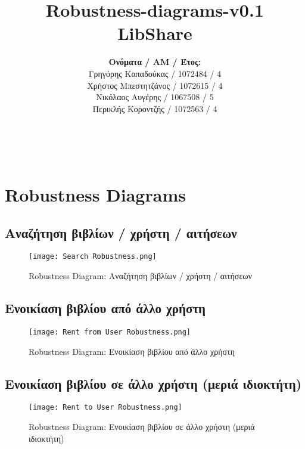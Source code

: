 \documentclass[12pt,a4paper]{article}
\title{Robustness-diagrams-v0.1 \\ LibShare}
\author{\textbf{Ονόματα / ΑΜ / Έτος:} \\ Γρηγόρης Καπαδούκας / 1072484 / 4\textdegree \\ Χρήστος Μπεστητζάνος / 1072615 / 4\textdegree \\ Νικόλαος Αυγέρης / 1067508 / 5\textdegree \\ Περικλής Κοροντζής / 1072563 / 4\textdegree}
\begin{document}
\makeatletter
\begin{center}
	\LARGE{\@title} \\
	\pagebreak
    \begin{LARGE}\@author\end{LARGE}
    \pagebreak
\end{center}

\section{Robustness Diagrams}

\subsection{Αναζήτηση βιβλίων / χρήστη / αιτήσεων}
\begin{figure}[H]
	\texttt{[image: Search Robustness.png]}
	\caption{Robustness Diagram: Αναζήτηση βιβλίων / χρήστη / αιτήσεων}
	\label{Robustness Diagram: Αναζήτηση βιβλίων / χρήστη / αιτήσεων}
\end{figure}

\subsection{Ενοικίαση βιβλίου από άλλο χρήστη}
\begin{figure}[H]
	\texttt{[image: Rent from User Robustness.png]}
	\caption{Robustness Diagram: Ενοικίαση βιβλίου από άλλο χρήστη}
	\label{Robustness Diagram: Ενοικίαση βιβλίου από άλλο χρήστη}
\end{figure}

\subsection{Ενοικίαση βιβλίου σε άλλο χρήστη (μεριά ιδιοκτήτη)}
\begin{figure}[H]
	\texttt{[image: Rent to User Robustness.png]}
	\caption{Robustness Diagram: Ενοικίαση βιβλίου σε άλλο χρήστη (μεριά ιδιοκτήτη)}
	\label{Robustness Diagram: Ενοικίαση βιβλίου σε άλλο χρήστη μεριά ιδιοκτήτη}
\end{figure}
\end{document}
